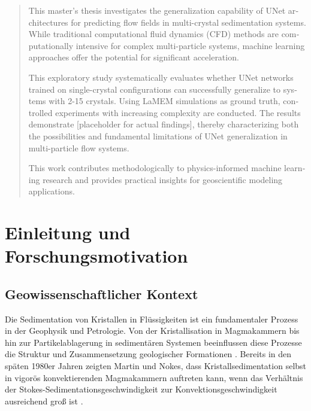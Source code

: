 \documentclass[12pt,twoside,openright]{scrreprt}
\theoremstyle{definition}
\theoremstyle{plain}
\begin{document}
\begin{otherlanguage}{english}
\begin{abstract}
This master's thesis investigates the generalization capability of UNet architectures for predicting flow fields in multi-crystal sedimentation systems. While traditional computational fluid dynamics (CFD) methods are computationally intensive for complex multi-particle systems, machine learning approaches offer the potential for significant acceleration.

This exploratory study systematically evaluates whether UNet networks trained on single-crystal configurations can successfully generalize to systems with 2-15 crystals. Using LaMEM simulations as ground truth, controlled experiments with increasing complexity are conducted. The results demonstrate [placeholder for actual findings], thereby characterizing both the possibilities and fundamental limitations of UNet generalization in multi-particle flow systems.

This work contributes methodologically to physics-informed machine learning research and provides practical insights for geoscientific modeling applications.
\end{abstract}
\end{otherlanguage}

\tableofcontents
\listoffigures
\listoftables

\chapter{Einleitung und Forschungsmotivation}
\label{ch:introduction}

\section{Geowissenschaftlicher Kontext}

Die Sedimentation von Kristallen in Flüssigkeiten ist ein fundamentaler Prozess in der Geophysik und Petrologie. Von der Kristallisation in Magmakammern bis hin zur Partikelablagerung in sedimentären Systemen beeinflussen diese Prozesse die Struktur und Zusammensetzung geologischer Formationen \parencite{martin1988crystal}. Bereits in den späten 1980er Jahren zeigten Martin und Nokes, dass Kristallsedimentation selbst in vigorös konvektierenden Magmakammern auftreten kann, wenn das Verhältnis der Stokes-Sedimentationsgeschwindigkeit zur Konvektionsgeschwindigkeit ausreichend groß ist \parencite{martin1988crystal,martin1989fluid}.
\end{document}

